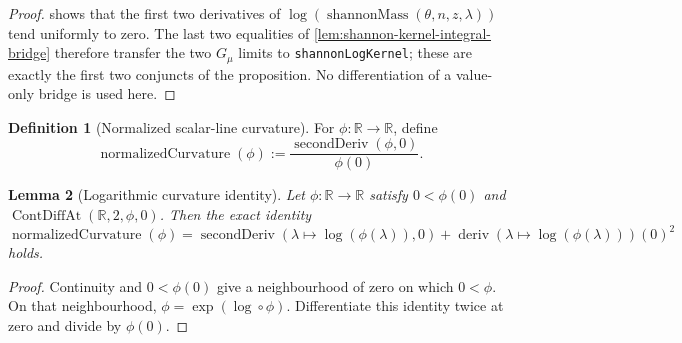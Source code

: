 \documentclass[9pt]{extarticle}
\newtheorem{lemma}{Lemma}[section]
\theoremstyle{definition}
\newtheorem{definition}[lemma]{Definition}
\theoremstyle{remark}
\newcommand{\R}{\mathbb R}
\begin{document}
\begin{proof}
 shows that the first two derivatives of
$\log(\operatorname{shannonMass}(\theta,n,z,\lambda))$ tend uniformly to
zero.  The last two equalities of
\cref{lem:shannon-kernel-integral-bridge} therefore transfer the two
$G_\mu$ limits to \texttt{shannonLogKernel}; these are exactly the first two
conjuncts of the proposition.  No differentiation of a value-only bridge is
used here.
\end{proof}

\begin{definition}[Normalized scalar-line curvature]
\label{def:normalized-curvature}
For $\phi:\R\to\R$, define
\[
 \operatorname{normalizedCurvature}(\phi):=
 \frac{\operatorname{secondDeriv}(\phi,0)}{\phi(0)}.
\]
\end{definition}

\begin{lemma}[Logarithmic curvature identity]
\label{lem:log-curvature-identity}
Let $\phi:\R\to\R$ satisfy $0<\phi(0)$ and
$\operatorname{ContDiffAt}(\R,2,\phi,0)$.  Then the exact identity
\begin{equation}
 \operatorname{normalizedCurvature}(\phi)
 =\operatorname{secondDeriv}(\lambda\mapsto\log(\phi(\lambda)),0)
  +\operatorname{deriv}(\lambda\mapsto\log(\phi(\lambda)))(0)^2
 \label{eq:log-curvature}
\end{equation}
holds.
\end{lemma}

\begin{proof}
Continuity and $0<\phi(0)$ give a neighbourhood of zero on which
$0<\phi$.  On that neighbourhood,
$\phi=\exp(\log\circ\phi)$.  Differentiate this identity twice at zero and
divide by $\phi(0)$.
\end{proof}
\end{document}
